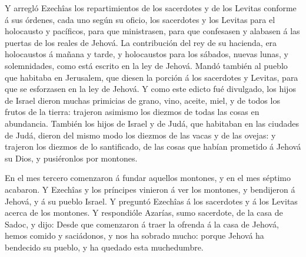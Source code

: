  Y arregló Ezechîas los repartimientos de los sacerdotes y
de los Levitas conforme á sus órdenes, cada uno según su oficio, los
sacerdotes y los Levitas para el holocausto y pacíficos, para que
ministrasen, para que confesasen y alabasen á las puertas de los reales
de Jehová.  La contribución del rey de su hacienda, era
holocaustos á mañana y tarde, y holocaustos para los sábados, nuevas
lunas, y solemnidades, como está escrito en la ley de Jehová.
 Mandó también al pueblo que habitaba en Jerusalem, que
diesen la porción á los sacerdotes y Levitas, para que se esforzasen en
la ley de Jehová.  Y como este edicto fué divulgado, los
hijos de Israel dieron muchas primicias de grano, vino, aceite, miel, y
de todos los frutos de la tierra: trajeron asimismo los diezmos de todas
las cosas en abundancia.  También los hijos de Israel y de
Judá, que habitaban en las ciudades de Judá, dieron del mismo modo los
diezmos de las vacas y de las ovejas: y trajeron los diezmos de lo
santificado, de las cosas que habían prometido á Jehová su Dios, y
pusiéronlos por montones.

 En el mes tercero comenzaron á fundar aquellos montones, y
en el mes séptimo acabaron.  Y Ezechîas y los príncipes
vinieron á ver los montones, y bendijeron á Jehová, y á su pueblo
Israel.  Y preguntó Ezechîas á los sacerdotes y á los
Levitas acerca de los montones.  Y respondióle Azarías,
sumo sacerdote, de la casa de Sadoc, y dijo: Desde que comenzaron á
traer la ofrenda á la casa de Jehová, hemos comido y saciádonos, y nos
ha sobrado mucho: porque Jehová ha bendecido su pueblo, y ha quedado
esta muchedumbre.

